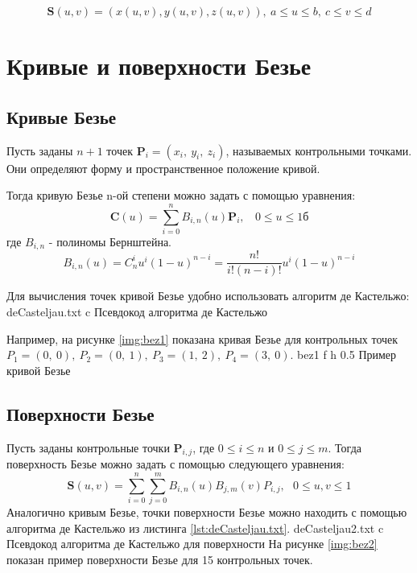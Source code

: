 \documentclass{bmstu}
\begin{document}
\begin{equation}
    \mathbf{S}(u, v) = (x(u, v), y(u, v), z(u, v)),~        a \le u \le b,~c \le v \le d
\end{equation}

\section{Кривые и поверхности Безье}

\subsection{Кривые Безье}

Пусть заданы $n+1$ точек $\mathbf{P}_i = (x_i,~y_i,~z_i)$, называемых контрольными точками. Они определяют форму и пространственное положение кривой.

Тогда кривую Безье n-ой степени можно задать с помощью уравнения:
\begin{equation}
    \mathbf{C}(u) = \sum\limits_{i=0}^n B_{i, n}(u)\mathbf{P}_i,~~~~ 0\le u\le 1б
\end{equation}
где $B_{i, n}$ - полиномы Бернштейна.
\begin{equation}
    B_{i, n}(u) = C^i_nu^i(1-u)^{n-i} = \frac{n!}{i!(n-i)!}u^i(1-u)^{n-i}
\end{equation}

Для вычисления точек кривой Безье удобно использовать алгоритм де Кастельжо:
{deCasteljau.txt} %
{c} %
{Псевдокод алгоритма де Кастельжо} %

Например, на рисунке \ref{img:bez1} показана кривая Безье для контрольных точек $P_1 = (0,~0),~P_2=(0,~1),~P_3=(1,~2),~P_4=(3,~0)$.
{bez1} %
{f} %
{h} %
{0.5\textwidth} %
{Пример кривой Безье} %

\subsection{Поверхности Безье}

Пусть заданы контрольные точки $\mathbf{P}_{i,j}$, где $0 \le i \le n$ и $0 \le j \le m$.
Тогда поверхность Безье можно задать с помощью следующего уравнения:
\begin{equation}
    \mathbf{S}(u,v)=\sum\limits_{i=0}^n\sum\limits_{j=0}^m B_{i,n}(u)B_{j,m}(v)P_{i,j},~~~ 0\le u,v\le 1
\end{equation}
Аналогично кривым Безье, точки поверхности Безье можно находить с помощью алгоритма де Кастельжо из листинга \ref{lst:deCasteljau.txt}.
{deCasteljau2.txt} %
{c} %
{Псевдокод алгоритма де Кастельжо для поверхности} %
На рисунке \ref{img:bez2} показан пример поверхности Безье для 15 контрольных точек.
\end{document}
